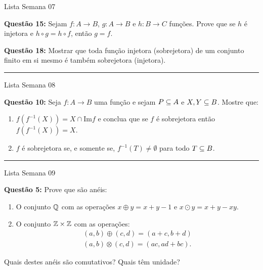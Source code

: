 \documentclass[12pt]{exam}
\begin{document}
    \vspace{.6cm}

    \begin{center}
        Lista Semana 07
    \end{center}
    \noindent \textbf{Questão 15:} Sejam $f : A \to B$, $g : A \to B$ e $h : B \to C$ fun\c{c}\~oes. Prove que se $h$ \'e injetora e $h \circ g = h \circ f$, ent\~ao $g = f$.
    
    \vspace{.3cm}

    \noindent \textbf{Questão 18:} Mostrar que toda fun{\c c}{\~a}o injetora (sobrejetora) de um conjunto finito em si mesmo {\'e} tamb{\'e}m sobrejetora (injetora).

    \hrule
    \begin{center}
        Lista Semana 08
    \end{center}

    \noindent \textbf{Questão 10:} Seja $f : A \to B$ uma fun{\c c}{\~a}o e sejam $P \subseteq
    A$ e $X, Y\subseteq B$. Mostre que:
    \begin{enumerate}
        \item[e)] $f(f^{-1}(X))= X \cap \mbox{Im}f$ e conclua que se $f$ {\'e} sobrejetora ent{\~a}o
    $f(f^{-1}(X))=X$.

        \item[g)] $f$ \'e sobrejetora se, e somente se, $f^{-1}(T) \ne \emptyset$ para todo $T \subseteq B$.
    \end{enumerate}

    \vspace{.3cm}

    \hrule
    \begin{center}
        Lista Semana 09
    \end{center}

    \noindent \textbf{Questão 5:} Prove que s\~ao an\'eis:
        \begin{enumerate}
            \item[b)] O conjunto $\mathbb{Q}$ com as opera\c{c}\~oes $x \oplus y = x + y - 1$ e $x \odot y = x + y - xy$.
            \item[c)] O conjunto $\mathbb{Z} \times \mathbb{Z}$ com as opera\c{c}\~oes:
            \begin{align*}
                (a, b) \oplus (c, d) = (a + c, b + d)\\
                (a ,b) \otimes (c, d) = (ac, ad + bc).
            \end{align*}
        \end{enumerate}
    Quais destes an\'eis s\~ao comutativos? Quais t\^em unidade?
\end{document}

